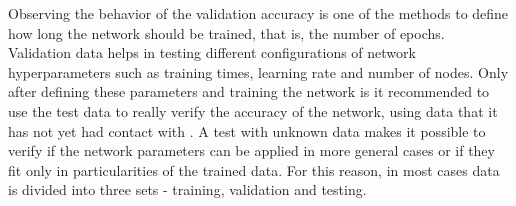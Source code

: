 Observing the behavior of the validation accuracy is one of the methods to define how long the network should be trained, that is, the number of epochs. Validation data helps in testing different configurations of network hyperparameters such as training times, learning rate and number of nodes. Only after defining these parameters and training the network is it recommended to use the test data to really verify the accuracy of the network, using data that it has not yet had contact with \cite{nielsen2015}. A test with unknown data makes it possible to verify if the network parameters can be applied in more general cases or if they fit only in particularities of the trained data. For this reason, in most cases data is divided into three sets - training, validation and testing.